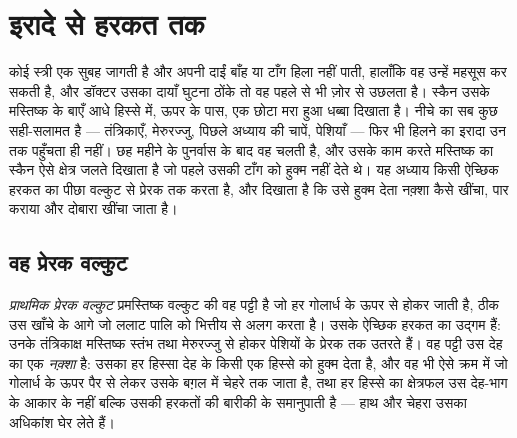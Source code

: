 \chapter{इरादे से हरकत तक}\label{ch:g12:brain-and-movement}

कोई स्त्री एक सुबह जागती है और अपनी दाईं बाँह या टाँग हिला नहीं पाती, हालाँकि
वह उन्हें महसूस कर सकती है, और डॉक्टर उसका दायाँ घुटना ठोंके तो वह पहले से
भी ज़ोर से उछलता है। स्कैन उसके मस्तिष्क के बाएँ आधे हिस्से में, ऊपर के पास,
एक छोटा मरा हुआ धब्बा दिखाता है। नीचे का सब कुछ सही-सलामत है --- तंत्रिकाएँ,
मेरुरज्जु, पिछले अध्याय की  चापें, पेशियाँ --- फिर भी हिलने का इरादा
उन तक पहुँचता ही नहीं। छह महीने के पुनर्वास के बाद वह चलती है, और उसके काम
करते मस्तिष्क का स्कैन ऐसे क्षेत्र जलते दिखाता है जो पहले उसकी टाँग को हुक्म
नहीं देते थे। यह अध्याय किसी ऐच्छिक हरकत का पीछा वल्कुट से प्रेरक  तक
करता है, और दिखाता है कि उसे हुक्म देता नक़्शा कैसे खींचा, पार कराया और
दोबारा खींचा जाता है।

\section{वह प्रेरक वल्कुट}

\begin{definition}[प्रेरक वल्कुट]\label{def:g12:brain-and-movement:cortex}
\emph{प्राथमिक प्रेरक वल्कुट} प्रमस्तिष्क वल्कुट की वह
पट्टी है जो हर गोलार्ध के ऊपर से होकर जाती है, ठीक उस खाँचे के आगे जो ललाट
पालि को भित्तीय से अलग करता है। उसके  ऐच्छिक हरकत का उद्गम हैं: उनके
तंत्रिकाक्ष मस्तिष्क स्तंभ तथा मेरुरज्जु से होकर पेशियों के प्रेरक
 तक उतरते हैं। वह पट्टी उस देह का एक \emph{नक़्शा} है: उसका हर
हिस्सा देह के किसी एक हिस्से को हुक्म देता है, और वह भी ऐसे क्रम में जो
गोलार्ध के ऊपर पैर से लेकर उसके बग़ल में चेहरे तक जाता है, तथा हर हिस्से का
क्षेत्रफल उस देह-भाग के आकार के नहीं बल्कि उसकी हरकतों की बारीकी के
समानुपाती है --- हाथ और चेहरा उसका अधिकांश घेर लेते हैं।
\end{definition}

